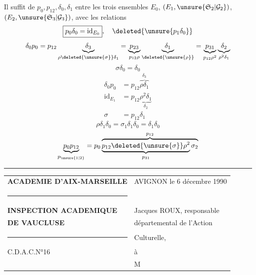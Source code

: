  Il suffit de  $p_0,p_{12},\delta_0,\delta_1$ entre les trois ensembles $E_0$, $(E_1,\unsure{\mathfrak S_2|\mathcal G_2})$, $(E_2,\unsure{\mathfrak S_3|\mathcal G_3})$, avec les relations
\[\boxed{p_0\delta_0=\mathrm{id}_{E_0}},\quad\deleted{\unsure{p_1\delta_0}}\]
\[\delta_0p_0=p_{12}\underbrace{\delta_3}_{\rho\deleted{\unsure{\sigma}}\delta_1}=\underbrace{p_{23}}_{p_{12}\rho}\underbrace{\delta_1}_{\deleted{\unsure{\rho}}}=\underbrace{p_{31}}_{p_{12}\rho^2}\underbrace{\delta_2}_{\rho^2\delta_1}\]
\[\boxed{\sigma\delta_0=\delta_0}\]
\deleted{\[\text{i.e.}\quad\underbrace{\delta_0p_0}=\underbrace{p_{12}\delta_1}_{\sigma}=\underbrace{p_{12}\rho\delta_1}_{\mathrm{id}}=\underbrace{p_{12}\rho^2\delta_1}\]}
\[\boxed{\begin{aligned}
\delta_0p_0&=p_{12}\overbrace{\rho\delta_1}^{\delta_3}\\
\mathrm{id}_{E_1}&=p_{12}\underbrace{\rho^2\delta_1}_{\delta_2}\\
\sigma&=p_{12}\delta_1
\end{aligned}}\]
\[\boxed{\rho\delta_1\delta_0=\sigma_1\delta_1\delta_0=\delta_1\delta_0}\]
\[\underbrace{p_0p_{12}}_{p_{\unsure{1|2}}}=p_0\overbrace{\underbrace{p_{12}\deleted{\unsure{\sigma}}\rho^2}_{p_{31}}\sigma_2}^{p_{12}}\]

\hrule
\begin{tabular}{p{.47\linewidth}p{.47\linewidth}}
\textbf{ACADEMIE D'AIX-MARSEILLE} & AVIGNON le 6 décembre 1990\\
\rule{3cm}{.4pt}&\\
\textbf{INSPECTION ACADEMIQUE} & Jacques ROUX, responsable\\
\textbf{DE VAUCLUSE}&départemental de l'Action\\
\rule{1cm}{.4pt}&Culturelle,\\[1em]
C.D.A.C.N°16&à\\[1em]
&M
\end{tabular}


